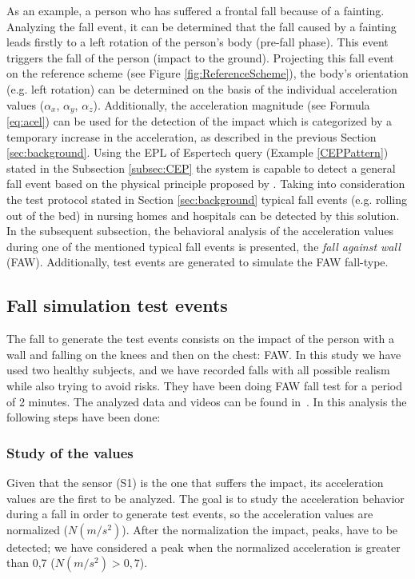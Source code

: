 \documentclass[10pt,journal,compsoc]{IEEEtran}
\begin{document}
As an example, a person who has suffered a frontal fall because of a fainting. Analyzing the fall event, it can be determined that the fall caused by a fainting leads firstly to a left rotation of the person's body (pre-fall phase). This event triggers the fall of the person (impact to the ground). Projecting this fall event on the reference scheme (see Figure \ref{fig:ReferenceScheme}), the body's orientation (e.g. left rotation) can be determined on the basis of the individual acceleration values ($\alpha_x$,  $\alpha_y$,  $\alpha_z$). Additionally, the acceleration magnitude (see Formula \ref{eq:acel}) can be used for the detection of the impact which is categorized by a temporary increase in the acceleration, as described in the previous Section \ref{sec:background}. Using the EPL of Espertech query (Example \ref{CEPPattern}) stated in the Subsection \ref{subsec:CEP} the system is capable to detect a general fall event based on the physical principle proposed by \cite{Kozina}.
Taking into consideration the test protocol stated in Section \ref{sec:background} typical fall events (e.g. rolling out of the bed) in nursing homes and hospitals can be detected by this solution. In the subsequent subsection, the behavioral analysis of the acceleration values during one of the mentioned typical fall events is presented, the \textit{fall against wall} (FAW). Additionally, test events are generated to simulate the FAW fall-type.

\subsection{Fall simulation test events}

The fall to generate the test events consists on the impact of the person with 
a wall and falling on the knees and then on the chest: FAW. 
In this study we have used two healthy subjects, and we have recorded falls with all 
possible realism while also trying to avoid risks. They have been doing FAW fall test for a period 
of 2 minutes. The analyzed data and videos can be found in~\cite{FallRepo}.
In this analysis the following steps have been done:

\subsubsection{Study of the values} Given that the sensor (S1) is the one that suffers the 
impact, its acceleration values are the first to be analyzed. The goal is to study 
the acceleration behavior during a fall in order to generate test events, so the acceleration 
values are normalized ($N(m/s^2)$). After the normalization the impact, peaks, 
have to be detected; we have considered a peak when the normalized acceleration is 
greater than 0,7 ($N(m/s^2) > 0,7$). 
\end{document}
